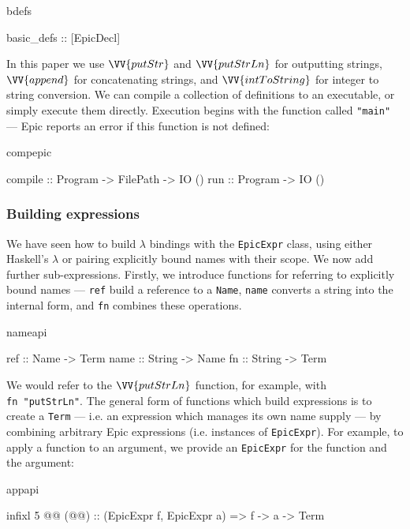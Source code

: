 \begin{SaveVerbatim}{bdefs}

basic_defs :: [EpicDecl]

\end{SaveVerbatim}

\noindent
In this paper we use $\VV{putStr}$ and $\VV{putStrLn}$ for outputting
strings, $\VV{append}$ for concatenating strings, and
$\VV{intToString}$ for integer to string conversion.
We can compile a collection of definitions to an executable, or simply
execute them directly. Execution begins with the function called
\texttt{"main"} --- Epic reports an error if this function is not
defined:

\begin{SaveVerbatim}{compepic}

compile :: Program -> FilePath -> IO ()
run     :: Program -> IO ()

\end{SaveVerbatim}

\subsubsection*{Building expressions}

We have seen how to build $\lambda$ bindings with the
\texttt{EpicExpr} class, using either Haskell's $\lambda$ or pairing
explicitly bound names with their scope. We now add further
sub-expressions. Firstly, we introduce functions for referring to
explicitly bound names --- \texttt{ref} build a reference to a
\texttt{Name}, \texttt{name} converts a string into the internal form,
and \texttt{fn} combines these operations.

\begin{SaveVerbatim}{nameapi}

ref  :: Name -> Term
name :: String -> Name
fn   :: String -> Term

\end{SaveVerbatim}

\noindent
We would refer to the $\VV{putStrLn}$ function, for example, with
\texttt{fn~"putStrLn"}. 
The general form of functions which build expressions is to create a
\texttt{Term} --- i.e. an expression which manages its own name supply
--- by combining arbitrary Epic expressions (i.e. instances of
\texttt{EpicExpr}). For example, to apply a function to an argument,
we provide an \texttt{EpicExpr} for the function and the argument:

\begin{SaveVerbatim}{appapi}

infixl 5 @@
(@@) :: (EpicExpr f, EpicExpr a) => f -> a -> Term

\end{SaveVerbatim}

